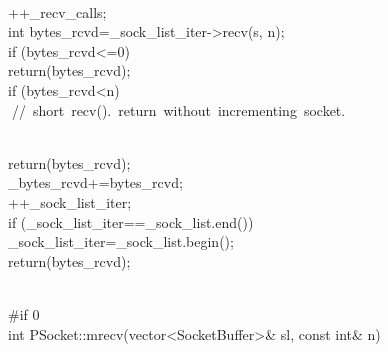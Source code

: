 \documentclass{article}
\begin{document}
 {
\\
         ++_recv_calls;
\\
     int bytes_rcvd=_sock_list_iter->recv(s, n);
\\
         if (bytes_rcvd<=0)
\\
                 return(bytes_rcvd);
\\
         if (bytes_rcvd<n)
\\
                 
\hbox{// short recv(). return without incrementing socket.}\strut\\
                 return(bytes_rcvd);
\\
         _bytes_rcvd+=bytes_rcvd;
\\
     ++_sock_list_iter;
\\
     if (_sock_list_iter==_sock_list.end())
\\
         _sock_list_iter=_sock_list.begin();
\\
     return(bytes_rcvd);
\\
 }
\\
 #if 0
\\
 int PSocket::mrecv(vector<SocketBuffer>& sl, const int& n)
\\
\end{document}
